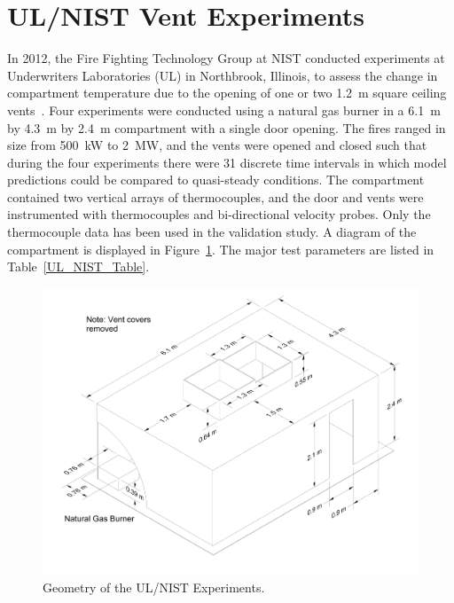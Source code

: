 \section{UL/NIST Vent Experiments}
\label{UL_NIST_Vents_Description}

In 2012, the Fire Fighting Technology Group at NIST conducted experiments at Underwriters Laboratories (UL) in Northbrook, Illinois, to assess the change in compartment temperature due to the opening of one or two 1.2~m square ceiling vents~\cite{Opert:Masters}. Four experiments were conducted using a natural gas burner in a 6.1~m by 4.3~m by 2.4~m compartment with a single door opening. The fires ranged in size from 500~kW to 2~MW, and the vents were opened and closed such that during the four experiments there were 31 discrete time intervals in which model predictions could be compared to quasi-steady conditions. The compartment contained two vertical arrays of thermocouples, and the door and vents were instrumented with thermocouples and bi-directional velocity probes. Only the thermocouple data has been used in the validation study. A diagram of the compartment is displayed in Figure~\ref{UL_NIST_Drawing}. The major test parameters are listed in Table~\ref{UL_NIST_Table}.

\begin{figure}[ht]
\includegraphics[width=\textwidth]{FIGURES/UL_NIST_Vents/UL_NIST_Vents_Drawing}
\caption{Geometry of the UL/NIST Experiments.}
\label{UL_NIST_Drawing}
\end{figure}


